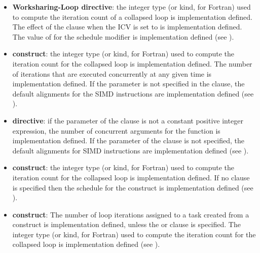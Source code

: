 \begin{itemize}
\item \textbf{Worksharing-Loop directive}: the integer type (or kind, for Fortran) used to compute the iteration
count of a collapsed loop is implementation defined. The effect of the
 clause when the  ICV is set to  is
implementation defined.
The value of  for the  schedule modifier is
implementation defined (see ).

\item {} \textbf{construct}: the integer type (or kind, for
  Fortran) used to compute the iteration count for the collapsed loop
  is implementation defined. The number of iterations that are
  executed concurrently at any given time is implementation
  defined. If the  parameter is not specified in the
   clause, the default alignments for the SIMD
  instructions are implementation defined (see ).

\item {} \textbf{directive}: if the parameter of the
   clause is not a constant positive integer expression,
  the number of concurrent arguments for the function is
  implementation defined. If the  parameter of the
   clause is not specified, the default alignments for
  SIMD instructions are implementation defined (see
  ).

\item {} \textbf{construct}: the integer type (or kind, for
    Fortran) used to compute the iteration count for the collapsed loop is
    implementation defined.  If no  clause is specified then the schedule for the 
construct is implementation defined (see ).

\item {} \textbf{construct}: The number of loop
  iterations assigned to a task created from a 
  construct is implementation defined, unless the  or
   clause is specified. The integer type (or kind,
  for Fortran) used to compute the iteration count for the collapsed
  loop is implementation defined (see ).



\end{itemize}

